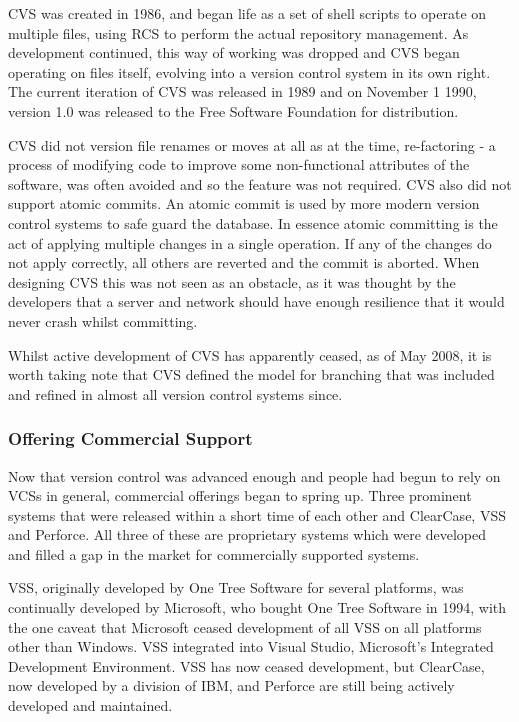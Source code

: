 CVS was created in 1986, and began life as a set of shell scripts to operate on multiple files, using RCS to perform the actual repository management.  As development continued, this way of working was dropped and CVS began operating on files itself, evolving into a version control system in its own right.  The current iteration of CVS was released in 1989 and on November 1 1990, version 1.0 was released to the Free Software Foundation for distribution.

CVS did not version file renames or moves at all as at the time, re-factoring - a process of modifying code to improve some non-functional attributes of the software, was often avoided and so the feature was not required.  CVS also did not support atomic commits.  An atomic commit is used by more modern version control systems to safe guard the database.  In essence atomic committing is the act of applying multiple changes in a single operation.  If any of the changes do not apply correctly, all others are reverted and the commit is aborted.  When designing CVS this was not seen as an obstacle, as it was thought by the developers that a server and network should have enough resilience that it would never crash whilst committing.

Whilst active development of CVS has apparently ceased, as of May 2008, it is worth taking note that CVS defined the model for branching that was included and refined in almost all version control systems since.  

\subsubsection{Offering Commercial Support}
Now that version control was advanced enough and people had begun to rely on VCSs in general, commercial offerings began to spring up.  Three prominent systems that were released within a short time of each other and ClearCase, VSS and Perforce.  All three of these are proprietary systems which were developed and filled a gap in the market for commercially supported systems.  

VSS, originally developed by One Tree Software for several platforms, was continually developed by Microsoft, who bought One Tree Software in 1994, with the one caveat that Microsoft ceased development of all VSS on all platforms other than Windows.  VSS integrated into Visual Studio, Microsoft's Integrated Development Environment.  VSS has now ceased development, but ClearCase, now developed by a division of IBM, and Perforce are still being actively developed and maintained.

